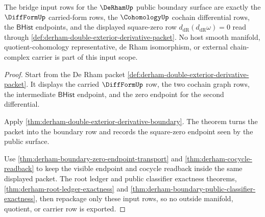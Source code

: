 \begin{theorem}
\label{thm:derham-bridge-input-source-scope}
The bridge input rows for the $\DeRhamUp$ public boundary surface are exactly
the $\DiffFormUp$ carried-form rows, the $\CohomologyUp$ cochain differential
rows, the $\mathsf{BHist}$ endpoints, and the displayed square-zero row
$d_{\mathrm{dR}}(d_{\mathrm{dR}}\omega)=0$ read through
\autoref{def:derham-double-exterior-derivative-packet}. No host smooth
manifold, quotient-cohomology representative, de Rham isomorphism, or external
chain-complex carrier is part of this input scope.
\end{theorem}
\begin{proof}
Start from the De Rham packet
\autoref{def:derham-double-exterior-derivative-packet}. It displays the
carried $\DiffFormUp$ row, the two cochain graph rows, the intermediate
$\mathsf{BHist}$ endpoint, and the zero endpoint for the second differential.

Apply \autoref{thm:derham-double-exterior-derivative-boundary}. The theorem
turns the packet into the boundary row and records the square-zero endpoint
seen by the public surface.

Use \autoref{thm:derham-boundary-zero-endpoint-transport} and
\autoref{thm:derham-cocycle-readback} to keep the visible endpoint and cocycle
readback inside the same displayed packet. The root ledger and public
classifier exactness theorems,
\autoref{thm:derham-root-ledger-exactness} and
\autoref{thm:derham-boundary-public-classifier-exactness}, then repackage
only these input rows, so no outside manifold, quotient, or carrier row is
exported.
\end{proof}

